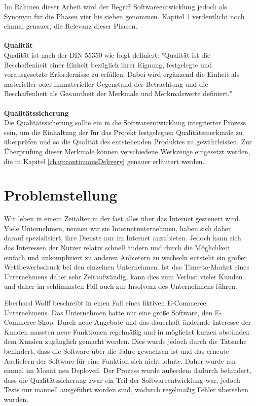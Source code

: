 Im Rahmen dieser Arbeit wird der Begriff Softwareentwicklung jedoch als Synonym für die Phasen vier bis sieben genommen. Kapitel \ref{sec:problemstellung}  verdeutlicht noch einmal genauer, die Relevanz dieser Phasen.
\\\\
\textbf{Qualität}\\
Qualität ist nach der DIN 55350 wie folgt definiert: "Qualität ist die Beschaffenheit einer Einheit bezüglich ihrer Eignung, festgelegte und vorausgesetzte Erfordernisse zu erfüllen. Dabei wird ergänzend die Einheit als materieller oder immaterieller Gegenstand der Betrachtung und die Beschaffenheit als Gesamtheit der Merkmale und Merkmalswerte definiert."
\\\\
\textbf{Qualitätssicherung}\\
Die Qualitätssicherung sollte ein in die Softwareentwicklung integrierter Prozess sein, um die Einhaltung der für das Projekt festgelegten Qualitätsmerkmale zu überprüfen und so die Qualität des entstehenden Produktes zu gewährleisten. Zur Überprüfung dieser Merkmale können verschiedene Werkzeuge eingesetzt werden, die in Kapitel \ref{chap:continuousDelivery}  genauer erläutert werden.

\section{Problemstellung}
\label{sec:problemstellung}
Wir leben in einem Zeitalter in der fast alles über das Internet gesteuert wird. Viele Unternehmen, nennen wir sie Internetunternehmen, haben sich daher darauf spezialisiert, ihre Dienste nur im Internet anzubieten. Jedoch kann sich das Interessen der Nutzer relativ schnell ändern und durch die Möglichkeit einfach und unkompliziert zu anderen Anbietern zu wechseln entsteht ein großer Wettbewerbsdruck bei den einzelnen Unternehmen. Ist das Time-to-Market eines Unternehmens daher sehr Zeitaufwändig, kann dies zum Verlust vieler Kunden und daher im schlimmsten Fall auch zur Insolvenz des Unternehmens führen.

Eberhard Wolff beschreibt in \cite[S. 2 ff.]{EWolff:CD} einen Fall eines fiktiven E-Commerce Unternehmens.
Das Unternehmen hatte nur eine große Software, den E-Commerce Shop. Durch neue Angebote und das dauerhaft ändernde Interesse der Kunden mussten neue Funktionen regelmäßig und in möglichst kurzen abständen dem Kunden zugänglich gemacht werden. Dies wurde jedoch durch die Tatsache behindert, dass die Software über die Jahre gewachsen ist und das erneute Ausliefern der Software für eine Funktion sich nicht lohnte. Daher wurde nur einmal im Monat neu Deployed. Der Prozess wurde außerdem dadurch behindert, dass die Qualitätssicherung zwar ein Teil der Softwareentwicklung war, jedoch Tests nur manuell ausgeführt worden sind, wodurch regelmäßig Fehler übersehen wurden.

